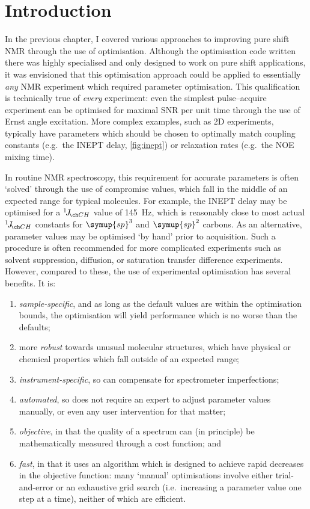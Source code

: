 \section{Introduction}
\label{sec:poise__introduction}

In the previous chapter, I covered various approaches to improving pure shift NMR through the use of optimisation.
Although the optimisation code written there was highly specialised and only designed to work on pure shift applications, it was envisioned that this optimisation approach could be applied to essentially \textit{any} NMR experiment which required parameter optimisation.
This qualification is technically true of \textit{every} experiment: even the simplest pulse--acquire experiment can be optimised for maximal SNR per unit time through the use of Ernst angle excitation.
More complex examples, such as 2D experiments, typically have parameters which should be chosen to optimally match coupling constants (e.g.\ the INEPT delay, \cref{fig:inept}) or relaxation rates (e.g.\ the NOE mixing time).

In routine NMR spectroscopy, this requirement for accurate parameters is often `solved' through the use of compromise values, which fall in the middle of an expected range for typical molecules.
For example, the INEPT delay may be optimised for a $\oneJ{CH}$ value of \qty{145}{\Hz}, which is reasonably close to most actual $\oneJ{CH}$ constants for $\symup{sp}^3$ and $\symup{sp}^2$ carbons.
As an alternative, parameter values may be optimised `by hand' prior to acquisition.
Such a procedure is often recommended for more complicated experiments such as solvent suppression, diffusion, or saturation transfer difference experiments.
However, compared to these, the use of experimental optimisation has several benefits.
It is:
\begin{enumerate}
    \item \textit{sample-specific}, and as long as the default values are within the optimisation bounds, the optimisation will yield performance which is no worse than the defaults;
    \item more \textit{robust} towards unusual molecular structures, which have physical or chemical properties which fall outside of an expected range;
    \item \textit{instrument-specific}, so can compensate for spectrometer imperfections;
    \item \textit{automated}, so does not require an expert to adjust parameter values manually, or even any user intervention for that matter;
    \item \textit{objective}, in that the quality of a spectrum can (in principle) be mathematically measured through a cost function; and
    \item \textit{fast}, in that it uses an algorithm which is designed to achieve rapid decreases in the objective function: many `manual' optimisations involve either trial-and-error or an exhaustive grid search (i.e.\ increasing a parameter value one step at a time), neither of which are efficient.
\end{enumerate}

